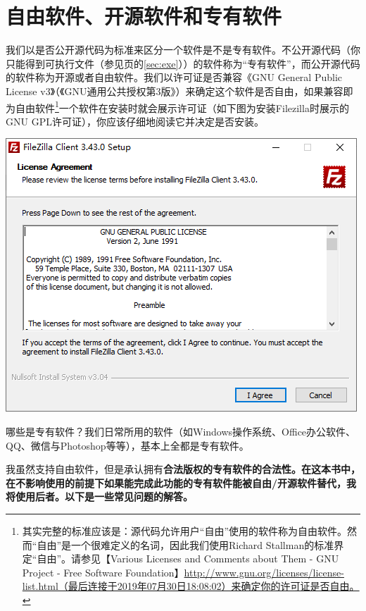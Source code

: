 \section{自由软件、开源软件和专有软件}
我们以是否公开源代码为标准来区分一个软件是不是专有软件。不公开源代码（你只能得到可执行文件（参见\pageref{sec:exe}页的\ref{sec:exe}））的软件称为“专有软件”，而公开源代码的软件称为开源或者自由软件。我们以许可证是否兼容《GNU General Public License v3》（《GNU通用公共授权第3版》）来确定这个软件是否自由，如果兼容即为自由软件\footnote{其实完整的标准应该是：源代码允许用户“自由”使用的软件称为自由软件。然而“自由”是一个很难定义的名词，因此我们使用Richard Stallman的标准界定“自由”。请参见【Various Licenses and Comments about Them - GNU Project - Free Software Foundation】\url{http://www.gnu.org/licenses/license-list.html（最后连接于2019年07月30日18:08:02）来确定你的许可证是否自由。}}一个软件在安装时就会展示许可证（如下图为安装Filezilla时展示的GNU GPL许可证），你应该仔细地阅读它并决定是否安装。
\begin{center}
	\includegraphics[scale=0.6]{pic/fzi}
\end{center}\par
哪些是专有软件？我们日常所用的软件（如Windows操作系统、Office办公软件、QQ、微信与Photoshop等等），基本上全都是专有软件。\par
我虽然支持自由软件，但是承认拥有\bf 合法版权\normalall 的专有软件的合法性。在这本书中，在\bf 不影响使用\normalall 的前提下如果能完成此功能的专有软件能被自由/开源软件替代，我将使用后者。以下是一些常见问题的解答。
